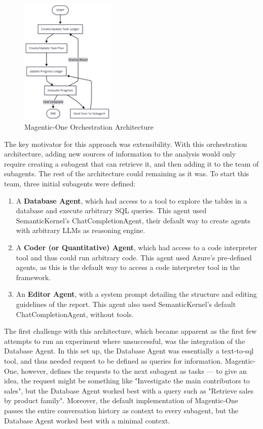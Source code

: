 \documentclass[a4paper]{report}
\begin{document}
\begin{figure}[h]
\centering
\includegraphics[width=0.4\textwidth]{images/mangentic-one-simplified.png}
\caption{Magentic-One Orchestration Architecture}
\label{fig:magentic-one-architecture}
\end{figure}

The key motivator for this approach was extensibility. With this orchestration architecture, adding new sources of information to the analysis would only require creating a subagent that can retrieve it, and then adding it to the team of subagents. The rest of the architecture could remaining as it was. To start this team, three initial subagents were defined:

\begin{enumerate}
    \item A \textbf{Database Agent}, which had access to a tool to explore the tables in a database and execute arbitrary SQL queries. This agent used SemanticKernel's ChatCompletionAgent, their default way to create agents with arbitrary LLMs as reasoning engine.
    \item A \textbf{Coder (or Quantitative) Agent}, which had access to a code interpreter tool and thus could run arbitrary code. This agent used Azure's pre-defined agents, as this is the default way to access a code interpreter tool in the framework.
    \item An \textbf{Editor Agent}, with a system prompt detailing the structure and editing guidelines of the report. This agent also used SemanticKernel's default ChatCompletionAgent, without tools.
\end{enumerate}

The first challenge with this architecture, which became apparent as the first few attempts to run an experiment where unsuccessful, was the integration of the Database Agent. In this set up, the Database Agent was essentially a text-to-sql tool, and thus needed request to be defined as queries for information. Magentic-One, however, defines the requests to the next subagent as tasks --- to give an idea, the request might be something like "Investigate the main contributors to sales", but the Database Agent worked best with a query such as "Retrieve sales by product family". Moreover, the default implementation of Magentic-One passes the entire conversation history as context to every subagent, but the Database Agent worked best with a minimal context.
\end{document}
